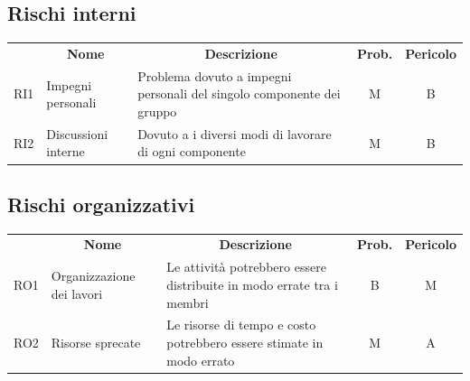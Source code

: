\subsection{Rischi interni}
\begin{table}[H]
\centering
\renewcommand{\arraystretch}{1.8}
    \begin{tabular}{c | p{4.2cm} | p{5cm} |c |  c  }
		\rowcolor[HTML]{a52a2a}
        \multicolumn{1}{c}{\color[HTML]{FFFFFF} \textbf{Codice}} &
        \multicolumn{1}{c}{\color[HTML]{FFFFFF} \textbf{Nome}} &
        \multicolumn{1}{c}{\color[HTML]{FFFFFF} \textbf{Descrizione}} &
        \multicolumn{1}{c}{\color[HTML]{FFFFFF} \textbf{Prob.}} &
        \multicolumn{1}{c}{\color[HTML]{FFFFFF} \textbf{Pericolo}}\\
	RI1 & Impegni personali & Problema dovuto a impegni personali del singolo componente dei gruppo & M & B \\
    RI2 & Discussioni interne & Dovuto a i diversi modi di lavorare di ogni componente & M & B \\
    \end{tabular}
	
\end{table}

\subsection{Rischi organizzativi}
\begin{table}[H]
\centering
\renewcommand{\arraystretch}{1.8}
    \begin{tabular}{c | p{4.2cm} | p{5cm} |c |  c  }
		\rowcolor[HTML]{a52a2a}
        \multicolumn{1}{c}{\color[HTML]{FFFFFF} \textbf{Codice}} &
        \multicolumn{1}{c}{\color[HTML]{FFFFFF} \textbf{Nome}} &
        \multicolumn{1}{c}{\color[HTML]{FFFFFF} \textbf{Descrizione}} &
        \multicolumn{1}{c}{\color[HTML]{FFFFFF} \textbf{Prob.}} &
        \multicolumn{1}{c}{\color[HTML]{FFFFFF} \textbf{Pericolo}}\\
	
        RO1 & Organizzazione dei lavori  & Le attività potrebbero essere distribuite in modo errate tra i membri & B & M \\
        RO2 & Risorse sprecate & Le risorse di tempo e costo potrebbero essere stimate in modo errato & M & A \\
    \end{tabular}
	
\end{table}

